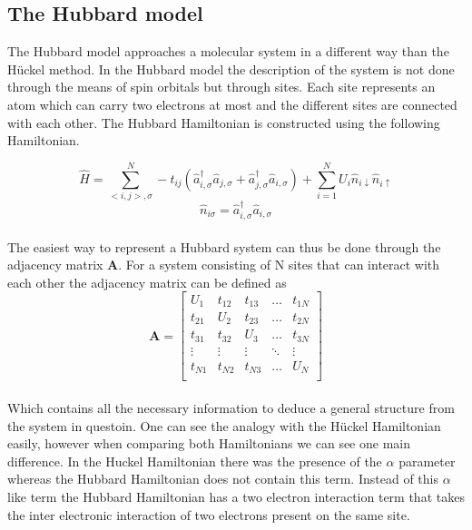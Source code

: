 \documentclass[]{article}
\begin{document}
\subsection{The Hubbard model}

The Hubbard model approaches a molecular system in a different way than the Hückel method. In the Hubbard model the description of the system is not done through the means of spin orbitals but through sites. Each site represents an atom which can carry two electrons at most and the different sites are connected with each other. The Hubbard Hamiltonian is constructed using the following Hamiltonian.

\begin{equation}
	\hat{H} = \sum_{<i,j>,\sigma}^{N}-t_{ij}\left (\hat{a}_{i,\sigma}^{\dagger} \hat{a}_{j,\sigma} + \hat{a}_{j,\sigma}^{\dagger} \hat{a}_{i,\sigma} \right) + \sum_{i=1}^{N}U_i \hat{n}_{i\downarrow}\hat{n}_{i\uparrow}
\end{equation}
\begin{equation*}
	\hat{n}_{i\sigma} = \hat{a}_{i,\sigma}^{\dagger} \hat{a}_{i,\sigma}
\end{equation*}
\\
The easiest way to represent a Hubbard system can thus be done through the adjacency matrix  \textbf{A}. For a system consisting of N sites that can interact with each other the adjacency matrix can be defined as
\begin{equation}
	\textbf{A}=
	\begin{bmatrix}
	U_1 & t_{12} & t_{13} & \dots & t_{1N} \\
	t_{21} & U_2 &t_{23} & \dots & t_{2N} \\
	t_{31} & t_{32} & U_3 & \dots & t_{3N} \\
	\vdots & \vdots & \vdots & \ddots & \vdots \\
	t_{N1} & t_{N2} & t_{N3} & \dots & U_N \\
	\end{bmatrix}
\end{equation}
\\
Which contains all the necessary information to deduce a general structure from the system in questoin. One can see the analogy with the Hückel Hamiltonian easily, however when comparing both Hamiltonians we can see one main difference. In the Huckel Hamiltonian there was the presence of the $\alpha$ parameter whereas the Hubbard Hamiltonian does not contain this term. Instead of this $\alpha$ like term the Hubbard Hamiltonian has a two electron interaction term that takes the inter electronic interaction of two electrons present on the same site.
\end{document}
